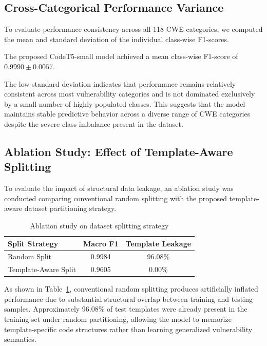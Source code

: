 \documentclass[conference]{IEEEtran}
\begin{document}
\subsection{Cross-Categorical Performance Variance}

To evaluate performance consistency across all 118 CWE categories, we computed the mean and standard deviation of the individual class-wise F1-scores.

The proposed CodeT5-small model achieved a mean class-wise F1-score of $0.9990 \pm 0.0057$.

The low standard deviation indicates that performance remains relatively consistent across most vulnerability categories and is not dominated exclusively by a small number of highly populated classes. This suggests that the model maintains stable predictive behavior across a diverse range of CWE categories despite the severe class imbalance present in the dataset.

\subsection{Ablation Study: Effect of Template-Aware Splitting}

To evaluate the impact of structural data leakage, an ablation study was conducted comparing conventional random splitting with the proposed template-aware dataset partitioning strategy.

\begin{table}[t]
\centering
\caption{Ablation study on dataset splitting strategy}
\label{tab:ablation}
\begin{tabular}{lcc}
\toprule
Split Strategy & Macro F1 & Template Leakage \\
\midrule
Random Split & 0.9984 & 96.08\% \\
Template-Aware Split & 0.9605 & 0.00\% \\
\bottomrule
\end{tabular}
\end{table}

As shown in Table~\ref{tab:ablation}, conventional random splitting produces artificially inflated performance due to substantial structural overlap between training and testing samples. Approximately 96.08\% of test templates were already present in the training set under random partitioning, allowing the model to memorize template-specific code structures rather than learning generalized vulnerability semantics.
\end{document}
